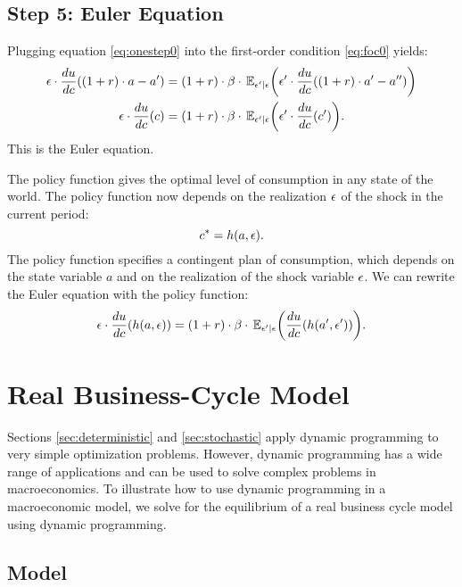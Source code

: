 \documentclass[letterpaper,12pt,leqno]{article}
\begin{document}
\subsection{Step 5: Euler Equation}

Plugging equation \eqref{eq:onestep0} into the first-order condition \eqref{eq:foc0} yields:
\begin{align}
\e \cdot \od{u}{c}((1+r)\cdot a-a')&=(1+r)\cdot \b\cdot\E[\e'|\e]{\e' \cdot \od{u}{c}((1+r)\cdot a'-a'')}\nonumber\\
\e \cdot \od{u}{c}(c)&=(1+r)\cdot \b\cdot\E[\e'|\e]{\e' \cdot \od{u}{c}(c')}.\label{eq:eulerstoc}
\end{align}
This is the Euler equation.

The policy function gives the optimal level of consumption in any state of the world. The policy function now depends on the realization $\epsilon$ of the shock in the current period:
\[c^{*}=h(a,\epsilon).\]
The policy function specifies a contingent plan of consumption, which depends on the state variable $a$ and on the realization of the shock variable $\epsilon$. We can rewrite the Euler equation with the policy function:
\begin{equation*}
\e \cdot \od{u}{c}(h(a,\e))=(1+r)\cdot\b \cdot \E[\e'|\e]{ \od{u}{c}(h(a',\e'))}.
\end{equation*}


\section{Real Business-Cycle Model}

Sections \ref{sec:deterministic} and \ref{sec:stochastic} apply dynamic programming to very simple optimization problems. However, dynamic programming has a wide range of applications and can be used to solve complex problems in macroeconomics. To illustrate how to use dynamic programming in a macroeconomic model, we solve for the equilibrium of a real business cycle model using dynamic programming.

\subsection{Model}
\end{document}
